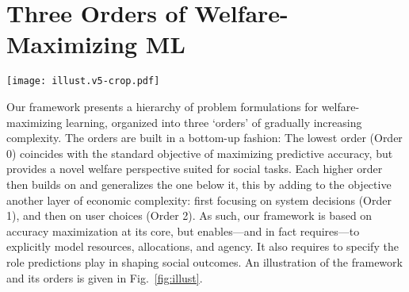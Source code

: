 \section{Three Orders of Welfare-Maximizing ML} \label{sec:orders}

\begin{figure*}[t!]
\centering
\texttt{[image: illust.v5-crop.pdf]}
\caption{
\textbf{Proposed framework:} The three orders of welfare-maximizing machine learning.
}
\label{fig:illust}
\end{figure*}




Our framework presents a hierarchy of problem formulations for welfare-maximizing learning,
organized into three `orders' of gradually increasing complexity.
The orders are built in a bottom-up fashion:
The lowest order (Order 0)
coincides with the standard objective of maximizing predictive accuracy,
but provides a novel welfare perspective suited for social tasks.
Each higher order then builds on and generalizes the one below it,
this by adding to the objective another layer of economic complexity:
first focusing on system decisions (Order 1),
and then on user choices (Order 2).
As such, our framework is based on accuracy maximization at its core,
but enables---and in fact requires---to explicitly model resources, allocations, and agency.
It also requires to specify the role predictions play in shaping social outcomes.
An illustration of the framework and its orders is given in Fig.~\ref{fig:illust}.
\squeeze

